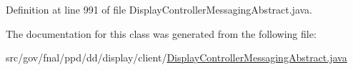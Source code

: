 Definition at line 991 of file Display\-Controller\-Messaging\-Abstract.\-java.



The documentation for this class was generated from the following file\-:\begin{DoxyCompactItemize}
\item 
src/gov/fnal/ppd/dd/display/client/\hyperlink{DisplayControllerMessagingAbstract_8java}{Display\-Controller\-Messaging\-Abstract.\-java}\end{DoxyCompactItemize}
